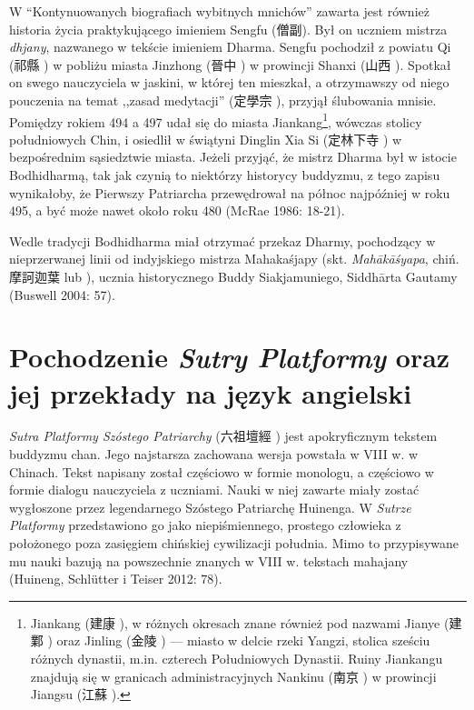 W ``Kontynuowanych biografiach wybitnych mnichów'' zawarta jest również historia życia praktykującego imieniem Sengfu (僧副).
Był on uczniem mistrza \textit{dhjany}, nazwanego w tekście imieniem Dharma. Sengfu pochodził z powiatu Qi (祁縣 ) w pobliżu miasta Jinzhong (晉中 ) w prowincji Shanxi (山西 ).
Spotkał on swego nauczyciela w jaskini, w której ten mieszkał, a otrzymawszy od niego pouczenia na temat ,,zasad medytacji'' (定學宗 ), przyjął ślubowania mnisie. Pomiędzy rokiem 494 a 497 udał się do miasta Jiankang\footnote{Jiankang (建康 ), w różnych okresach znane również pod nazwami Jianye (建鄴 ) oraz Jinling (金陵 ) --- miasto w delcie rzeki Yangzi, stolica sześciu różnych dynastii, m.in. czterech Południowych Dynastii. Ruiny Jiankangu znajdują się w granicach administracyjnych Nankinu (南京 ) w prowincji Jiangsu (江蘇 ).}, wówczas stolicy południowych Chin, i osiedlił w świątyni Dinglin Xia Si (定林下寺 ) w bezpośrednim sąsiedztwie miasta.
Jeżeli przyjąć, że mistrz Dharma był w istocie Bodhidharmą, tak jak czynią to niektórzy historycy buddyzmu, z tego zapisu wynikałoby, że Pierwszy Patriarcha przewędrował na północ najpóźniej w roku 495, a być może nawet około roku 480
(McRae 1986: 18-21).

Wedle tradycji Bodhidharma miał otrzymać przekaz Dharmy, pochodzący w nieprzerwanej linii od indyjskiego mistrza Mahakaśjapy (skt. \textit{Mahākāśyapa}, chiń. 摩訶迦葉  lub ), ucznia historycznego Buddy Siakjamuniego, Siddhārta Gautamy
(Buswell 2004: 57).

\section{Pochodzenie \textit{Sutry Platformy} oraz jej przekłady na język angielski}
\textit{Sutra Platformy Szóstego Patriarchy} (六祖壇經 ) jest apokryficznym tekstem buddyzmu chan.
Jego najstarsza zachowana wersja powstała w VIII w. w Chinach. Tekst napisany został częściowo w formie monologu, a częściowo w formie dialogu nauczyciela z uczniami.
Nauki w niej zawarte miały zostać wygłoszone przez legendarnego Szóstego Patriarchę Huinenga.
W \textit{Sutrze Platformy} przedstawiono go jako niepiśmiennego, prostego człowieka z położonego poza zasięgiem chińskiej cywilizacji południa.
Mimo to przypisywane mu nauki bazują na powszechnie znanych w VIII w. tekstach mahajany
(Huineng, Schlütter i Teiser 2012: 78).


